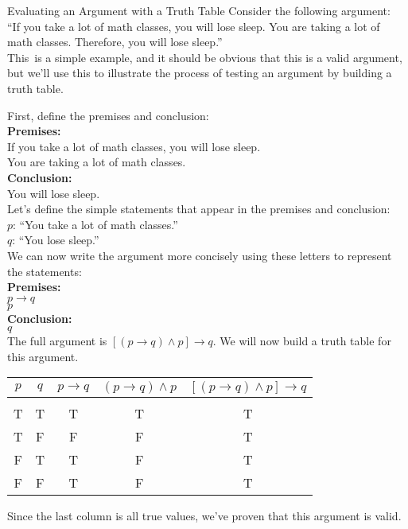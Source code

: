 \begin{example}[https://www.youtube.com/watch?v=IWk35nPpq3g]{Evaluating an Argument with a Truth Table}
Consider the following argument:\\
``If you take a lot of math classes, you will lose sleep.  You are taking a lot of math classes.  Therefore, you will lose sleep.''\\

This\sol\ is a simple example, and it should be obvious that this is a valid argument, but we'll use this to illustrate the process of testing an argument by building a truth table.

First, define the premises and conclusion:\\

\textbf{Premises:}\\
If you take a lot of math classes, you will lose sleep.\\
You are taking a lot of math classes.\\

\textbf{Conclusion:}\\
You will lose sleep.\\

Let's define the simple statements that appear in the premises and conclusion:\\
$p$: ``You take a lot of math classes.''\\
$q$: ``You lose sleep.''\\

We can now write the argument more concisely using these letters to represent the statements:\\

\textbf{Premises:}\\
$p \to q$\\
$p$\\

\textbf{Conclusion:}\\
$q$\\

The full argument is $[(p \to q) \wedge p] \to q$.  We will now build a truth table for this argument.
\begin{center}
\begin{tabular}{|c c c c c|}
\hline
$p$ & $q$ & $p \to q$ & $(p \to q) \wedge p$ & $[(p \to q) \wedge p] \to q$\\
\hline
& & & & \\
T & T & T & T & T\\
T & F & F & F & T\\
F & T & T & F & T\\
F & F & T & F & T\\
\hline
\end{tabular}
\end{center}
Since the last column is all true values, we've proven that this argument is valid.
\end{example}

